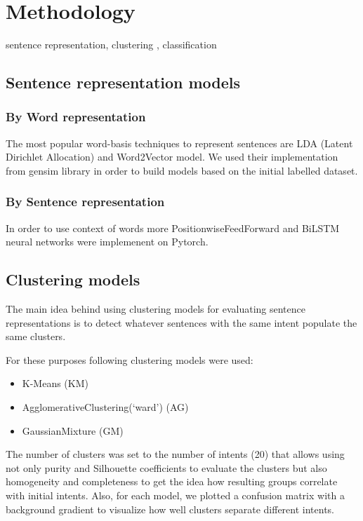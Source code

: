 \documentclass[11pt]{article}
\begin{document}
\section{Methodology}

sentence representation, clustering , classification



\subsection{Sentence representation models}

\subsubsection{By Word representation}

The most popular word-basis techniques to represent sentences are LDA (Latent Dirichlet Allocation) and Word2Vector model. We used their implementation from gensim library in order to build models based on the initial labelled dataset.

\subsubsection{By Sentence representation}

In order to use context of words more PositionwiseFeedForward and BiLSTM neural networks were implemenent on Pytorch.



\subsection{Clustering models}

The main idea behind using clustering models for evaluating sentence representations is to detect whatever sentences with the same intent populate the same clusters.

For these purposes following clustering models were used: 
\begin{itemize}
\item K-Means (KM)
\item AgglomerativeClustering(‘ward’) (AG)
\item GaussianMixture (GM)
\end{itemize}

The number of clusters was set to the number of intents (20) that allows using not only purity and Silhouette coefficients to evaluate the clusters but also homogeneity and completeness to get the idea how resulting groups correlate with initial intents. Also, for each model, we plotted a confusion matrix with a background gradient to visualize how well clusters separate different intents.
\end{document}
